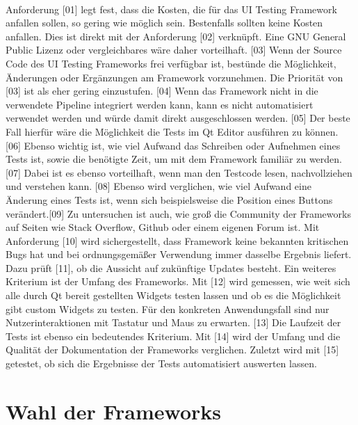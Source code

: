 		\paragraph{}Anforderung [01] legt fest, dass die Kosten, die für das UI Testing Framework anfallen sollen, so gering wie möglich sein. Bestenfalls sollten keine Kosten anfallen. Dies ist direkt mit der Anforderung [02] verknüpft. Eine GNU General Public Lizenz oder vergleichbares wäre daher vorteilhaft. [03] Wenn der Source Code des UI Testing Frameworks frei verfügbar ist, bestünde die Möglichkeit, Änderungen oder Ergänzungen am Framework vorzunehmen. Die Priorität von [03] ist als eher gering einzustufen. [04] Wenn das Framework nicht in die verwendete Pipeline integriert werden kann, kann es nicht automatisiert verwendet werden und würde damit direkt ausgeschlossen werden. [05] Der beste Fall hierfür wäre die Möglichkeit die Tests im Qt Editor ausführen zu können. [06] Ebenso wichtig ist, wie viel Aufwand das Schreiben oder Aufnehmen eines Tests ist, sowie die benötigte Zeit, um mit dem Framework familiär zu werden. [07] Dabei ist es ebenso vorteilhaft, wenn man den Testcode lesen, nachvollziehen und verstehen kann. [08] Ebenso wird verglichen, wie viel Aufwand eine Änderung eines Tests ist, wenn sich beispielsweise die Position eines Buttons verändert.[09] Zu untersuchen ist auch, wie groß die Community der Frameworks auf Seiten wie Stack Overflow, Github oder einem eigenen Forum ist. Mit Anforderung [10] wird sichergestellt, dass Framework keine bekannten kritischen Bugs hat und bei ordnungsgemäßer Verwendung immer dasselbe Ergebnis liefert. Dazu prüft [11], ob die Aussicht auf zukünftige Updates besteht. Ein weiteres Kriterium ist der Umfang des Frameworks. Mit [12] wird gemessen, wie weit sich alle durch Qt bereit gestellten Widgets testen lassen und ob es die Möglichkeit gibt custom Widgets zu testen. Für den konkreten Anwendungsfall sind nur Nutzerinteraktionen mit Tastatur und Maus zu erwarten. [13] Die Laufzeit der Tests ist ebenso ein bedeutendes Kriterium. Mit [14] wird der Umfang und die Qualität der Dokumentation der Frameworks verglichen. Zuletzt wird mit [15] getestet, ob sich die Ergebnisse der Tests automatisiert auswerten lassen.
		
		\section{Wahl der Frameworks}
